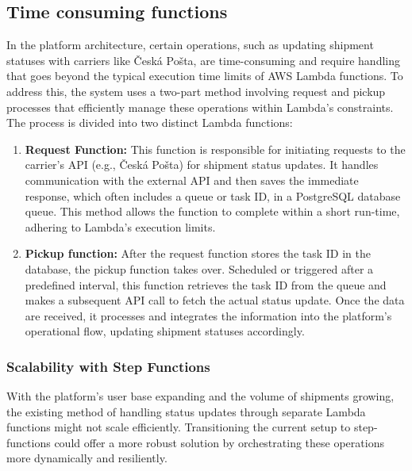 \subsection{Time consuming functions}
In the platform architecture, certain operations, such as updating shipment statuses with carriers like Česká Pošta, are time-consuming and require handling that goes beyond the typical execution time limits of AWS Lambda functions. 
To address this, the system uses a two-part method involving request and pickup processes that efficiently manage these operations within Lambda's constraints.
The process is divided into two distinct Lambda functions:
\begin{enumerate}
    \item \textbf{Request Function:} This function is responsible for initiating requests to the carrier's API (e.g., Česká Pošta) for shipment status updates. It handles communication with the external API and then saves the immediate response, which often includes a queue or task ID, in a PostgreSQL database queue. This method allows the function to complete within a short run-time, adhering to Lambda's execution limits.
    \item \textbf{Pickup function:} After the request function stores the task ID in the database, the pickup function takes over. Scheduled or triggered after a predefined interval, this function retrieves the task ID from the queue and makes a subsequent API call to fetch the actual status update. Once the data are received, it processes and integrates the information into the platform's operational flow, updating shipment statuses accordingly.
\end{enumerate}

\subsubsection{Scalability with Step Functions}
With the platform's user base expanding and the volume of shipments growing, the existing method of handling status updates through separate Lambda functions might not scale efficiently. Transitioning the current setup to \gls{step-functions} could offer a more robust solution by orchestrating these operations more dynamically and resiliently.





